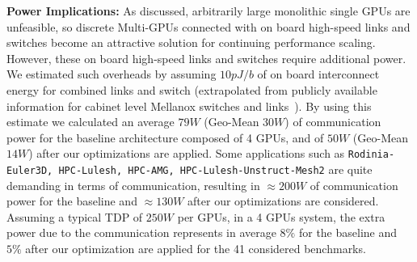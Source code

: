 \textbf{Power Implications:} As discussed, arbitrarily large monolithic 
single GPUs are unfeasible, so discrete Multi-GPUs connected with on board 
high-speed links and switches become an attractive solution for continuing 
performance scaling. However, these on board high-speed links and switches 
require additional power. We estimated such overheads by assuming $10 pJ/b$ of 
on board interconnect energy for combined links and switch (extrapolated from 
publicly available information for cabinet level Mellanox switches and 
links~\cite{mlswitch,mlnic}). By using this estimate we calculated an average 
$79 W$ (Geo-Mean $30 W$) of communication power for the baseline 
architecture composed of 4 GPUs, and of $50 W$ (Geo-Mean $14 W$) after 
our optimizations are applied. Some applications such as 
\texttt{Rodinia-Euler3D, HPC-Lulesh, HPC-AMG, HPC-Lulesh-Unstruct-Mesh2} are 
quite demanding in terms of communication, resulting in $\approx 200 W$ 
of communication power for the baseline and $\approx 130 W$ after our 
optimizations are considered. Assuming a typical TDP of $250 W$ per GPUs, 
in a 4 GPUs system, the extra power due to the communication represents in 
average $8\%$ for the baseline and $5\%$ after our optimization are applied 
for the 41 considered benchmarks.

